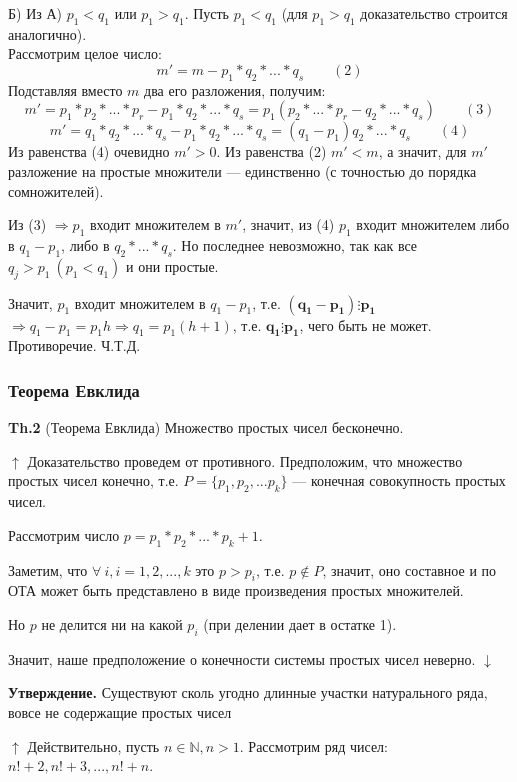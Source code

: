 \documentclass{article}
\begin{document}
  Б) Из А) \( p_1 < q_1 \) или \( p_1 > q_1 \). Пусть \( p_1 < q_1 \) (для \( p_1 > q_1 \) доказательство строится аналогично).\\
  Рассмотрим целое число: \[ m' = m - p_1*q_2*...*q_s\qquad (2) \]
  Подставляя вместо \( m \) два его разложения, получим: \[ m' = p_1*p_2*...*p_r - p_1*q_2*...*q_s = p_1(p_2*...*p_r - q_2*...*q_s)\qquad (3) \] \[ m' = q_1*q_2*...*q_s - p_1*q_2*...*q_s = (q_1 - p_1)q_2*...*q_s\qquad (4) \]
  Из равенства (4) очевидно \( m' > 0 \). Из равенства (2) \( m' < m \), а значит, для \( m' \) разложение на простые множители --- единственно (с точностью до порядка сомножителей).

  Из (3) \( \Rightarrow p_1 \) входит множителем в \( m' \), значит, из (4) \( p_1 \) входит множителем либо в \( q_1 - p_1 \), либо в \( q_2*...*q_s \). Но последнее невозможно, так как все \( q_j > p_1\ (p_1 < q_1) \) и они простые.
  
  Значит, \( p_1 \) входит множителем в \( q_1 - p_1 \), т.е. \( \mathbf{(q_1 - p_1) \vdots p_1} \) \( \Rightarrow q_1 - p_1 = p_1h \Rightarrow q_1 = p_1(h + 1) \), т.е. \( \mathbf{q_1 \vdots p_1} \), чего быть не может. Противоречие. Ч.Т.Д.

  \subsubsection{Теорема Евклида}
  \textbf{Th.2} (Теорема Евклида) Множество простых чисел бесконечно.

  \( \uparrow \) Доказательство проведем от противного. Предположим, что множество простых чисел конечно, т.е. \( P=\{p_1,p_2,...p_k\} \) --- конечная совокупность простых чисел.

  Рассмотрим число \( p = p_1*p_2*...*p_k + 1 \).

  Заметим, что \( \forall\ i, i=1,2,...,k \) это \( p > p_i \), т.е. \( p \notin P \), значит, оно составное и по ОТА может быть представлено в виде произведения простых множителей.

  Но \( p \) не делится ни на какой \( p_i \) (при делении дает в остатке 1).

  Значит, наше предположение о конечности системы простых чисел неверно. \( \downarrow \)

  \textbf{Утверждение.} Существуют сколь угодно длинные участки натурального ряда, вовсе не содержащие простых чисел

  \( \uparrow \) Действительно, пусть \( n \in \mathbb{N}, n > 1 \). Рассмотрим ряд чисел: \( n! + 2,n! + 3,...,n! + n \).
  
\end{document}
